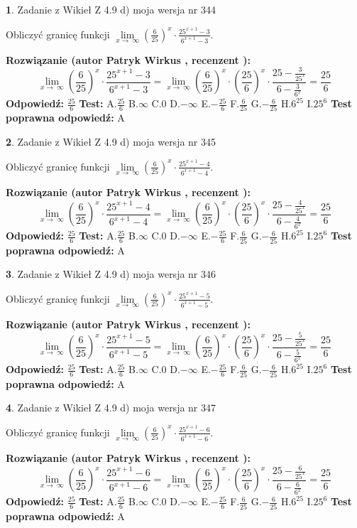 \documentclass[12pt, a4paper]{article}
\theoremstyle{definition} %
\newtheorem{zad}{}
\newcommand{\zadStart}[1]{\begin{zad}#1\newline}
\newcommand{\zadStop}{\end{zad}}
\newcommand{\rozwStart}[2]{\noindent \textbf{Rozwiązanie (autor #1 , recenzent #2): }\newline}
\newcommand{\rozwStop}{\newline}
\newcommand{\odpStart}{\noindent \textbf{Odpowiedź:}\newline}
\newcommand{\odpStop}{\newline}
\newcommand{\testStart}{\noindent \textbf{Test:}\newline}
\newcommand{\testStop}{\newline}
\newcommand{\kluczStart}{\noindent \textbf{Test poprawna odpowiedź:}\newline}
\newcommand{\kluczStop}{\newline}
\begin{document}
\zadStart{Zadanie z Wikieł Z 4.9 d) moja wersja nr 344}


Obliczyć granicę funkcji  $\lim\limits_{x\to\ \infty}(\frac{6}{25})^{x}\cdot\frac{25^{x+1}-3}{6^{x+1}-3}$.
\zadStop
\rozwStart{Patryk Wirkus}{}
$$\lim\limits_{x\to\ \infty}(\frac{6}{25})^{x}\cdot\frac{25^{x+1}-3}{6^{x+1}-3}=\lim\limits_{x\to\ \infty}(\frac{6}{25})^{x}\cdot(\frac{25}{6})^{x} \cdot \frac{25-\frac{3}{25^{x}}}{6-\frac{3}{6^{x}}} = \frac{25}{6}$$
\rozwStop
\odpStart
$\frac{25}{6}$
\odpStop
\testStart
A.$\frac{25}{6}$ B.$\infty$ C.$0$ D.$-\infty$ E.$-\frac{25}{6}$
F.$\frac{6}{25}$ G.$-\frac{6}{25}$
H.$6^{25}$
I.$25^{6}$
\testStop
\kluczStart
A
\kluczStop



\zadStart{Zadanie z Wikieł Z 4.9 d) moja wersja nr 345}


Obliczyć granicę funkcji  $\lim\limits_{x\to\ \infty}(\frac{6}{25})^{x}\cdot\frac{25^{x+1}-4}{6^{x+1}-4}$.
\zadStop
\rozwStart{Patryk Wirkus}{}
$$\lim\limits_{x\to\ \infty}(\frac{6}{25})^{x}\cdot\frac{25^{x+1}-4}{6^{x+1}-4}=\lim\limits_{x\to\ \infty}(\frac{6}{25})^{x}\cdot(\frac{25}{6})^{x} \cdot \frac{25-\frac{4}{25^{x}}}{6-\frac{4}{6^{x}}} = \frac{25}{6}$$
\rozwStop
\odpStart
$\frac{25}{6}$
\odpStop
\testStart
A.$\frac{25}{6}$ B.$\infty$ C.$0$ D.$-\infty$ E.$-\frac{25}{6}$
F.$\frac{6}{25}$ G.$-\frac{6}{25}$
H.$6^{25}$
I.$25^{6}$
\testStop
\kluczStart
A
\kluczStop



\zadStart{Zadanie z Wikieł Z 4.9 d) moja wersja nr 346}


Obliczyć granicę funkcji  $\lim\limits_{x\to\ \infty}(\frac{6}{25})^{x}\cdot\frac{25^{x+1}-5}{6^{x+1}-5}$.
\zadStop
\rozwStart{Patryk Wirkus}{}
$$\lim\limits_{x\to\ \infty}(\frac{6}{25})^{x}\cdot\frac{25^{x+1}-5}{6^{x+1}-5}=\lim\limits_{x\to\ \infty}(\frac{6}{25})^{x}\cdot(\frac{25}{6})^{x} \cdot \frac{25-\frac{5}{25^{x}}}{6-\frac{5}{6^{x}}} = \frac{25}{6}$$
\rozwStop
\odpStart
$\frac{25}{6}$
\odpStop
\testStart
A.$\frac{25}{6}$ B.$\infty$ C.$0$ D.$-\infty$ E.$-\frac{25}{6}$
F.$\frac{6}{25}$ G.$-\frac{6}{25}$
H.$6^{25}$
I.$25^{6}$
\testStop
\kluczStart
A
\kluczStop



\zadStart{Zadanie z Wikieł Z 4.9 d) moja wersja nr 347}


Obliczyć granicę funkcji  $\lim\limits_{x\to\ \infty}(\frac{6}{25})^{x}\cdot\frac{25^{x+1}-6}{6^{x+1}-6}$.
\zadStop
\rozwStart{Patryk Wirkus}{}
$$\lim\limits_{x\to\ \infty}(\frac{6}{25})^{x}\cdot\frac{25^{x+1}-6}{6^{x+1}-6}=\lim\limits_{x\to\ \infty}(\frac{6}{25})^{x}\cdot(\frac{25}{6})^{x} \cdot \frac{25-\frac{6}{25^{x}}}{6-\frac{6}{6^{x}}} = \frac{25}{6}$$
\rozwStop
\odpStart
$\frac{25}{6}$
\odpStop
\testStart
A.$\frac{25}{6}$ B.$\infty$ C.$0$ D.$-\infty$ E.$-\frac{25}{6}$
F.$\frac{6}{25}$ G.$-\frac{6}{25}$
H.$6^{25}$
I.$25^{6}$
\testStop
\kluczStart
A
\kluczStop
\end{document}
